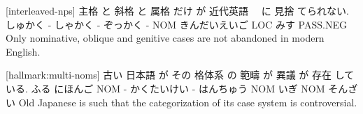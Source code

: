[interleaved-nps]
主格    と 斜格   と 属格    だけ が 近代英語　     に  見捨 てられない.
しゅかく - しゃかく - ぞっかく -  NOM きんだいえいご LOC みす PASS.NEG
Only nominative, oblique and genitive cases are not abandoned in modern English.

[hallmark:multi-noms]
古い 日本語   が  その 格体系     の 範疇      が   異議 が  存在 している.
ふる にほんご NOM -   かくたいけい - はんちゅう NOM いぎ NOM そんざい
Old Japanese is such that the categorization of its case system is controversial.
